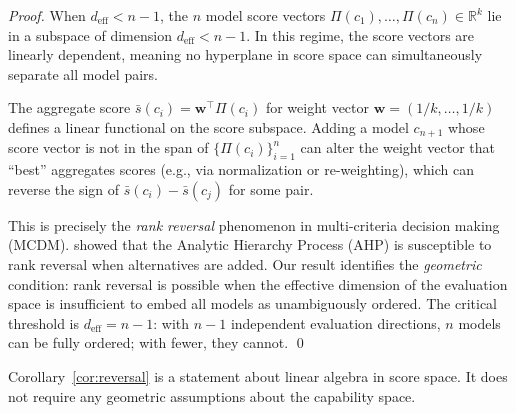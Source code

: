 \begin{proof}
When $d_{\mathrm{eff}} < n - 1$, the $n$ model score vectors $\Pi(c_1), \ldots, \Pi(c_n) \in \mathbb{R}^k$ lie in a subspace of dimension $d_{\mathrm{eff}} < n - 1$. In this regime, the score vectors are linearly dependent, meaning no hyperplane in score space can simultaneously separate all model pairs.

The aggregate score $\bar{s}(c_i) = \mathbf{w}^\top \Pi(c_i)$ for weight vector $\mathbf{w} = (1/k, \ldots, 1/k)$ defines a linear functional on the score subspace. Adding a model $c_{n+1}$ whose score vector is not in the span of $\{\Pi(c_i)\}_{i=1}^n$ can alter the weight vector that ``best'' aggregates scores (e.g., via normalization or re-weighting), which can reverse the sign of $\bar{s}(c_i) - \bar{s}(c_j)$ for some pair.

This is precisely the \emph{rank reversal} phenomenon in multi-criteria decision making (MCDM). \citet{belton1983short} showed that the Analytic Hierarchy Process (AHP) is susceptible to rank reversal when alternatives are added. Our result identifies the \emph{geometric} condition: rank reversal is possible when the effective dimension of the evaluation space is insufficient to embed all models as unambiguously ordered. The critical threshold is $d_{\mathrm{eff}} = n - 1$: with $n - 1$ independent evaluation directions, $n$ models can be fully ordered; with fewer, they cannot. \qed
\end{proof}

\begin{remark}
Corollary~\ref{cor:reversal} is a statement about linear algebra in score space. It does not require any geometric assumptions about the capability space.
\end{remark}
